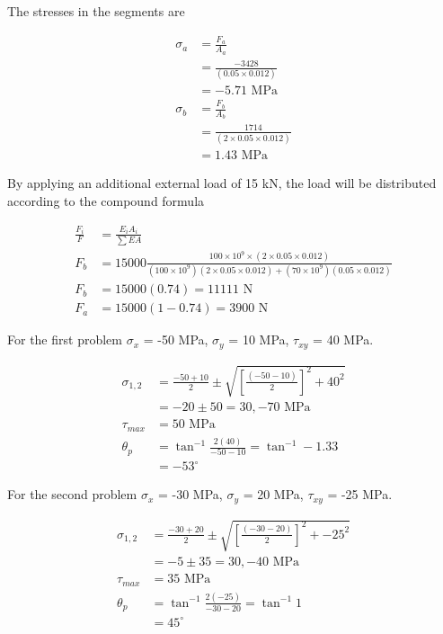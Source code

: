 \documentclass[
10pt,
a4paper,
openany,
svgnames,
]{book}
\begin{document}
\begin{evensolution}
  The stresses in the segments are

  \begin{align*}
    \sigma_a &= \frac{F_a}{A_a} \\
             &= \frac{-3428}{(0.05 \times 0.012)} \\
             &= -5.71 \text{ MPa} \\
    \sigma_b &= \frac{F_b}{A_b} \\
             &= \frac{1714}{(2 \times 0.05 \times 0.012)} \\
             &= 1.43 \text{ MPa}
  \end{align*}

  By applying an additional external load of 15 kN, the load will be distributed according to the compound formula

  \begin{align*}
    \frac{F_i}{F} &= \frac{E_iA_i}{\sum EA} \\
    F_b &= 15000 \frac{100 \times 10^9 \times (2 \times 0.05 \times 0.012)}{(100 \times 10^9)(2 \times 0.05 \times 0.012) + (70 \times 10^9)(0.05 \times 0.012)} \\
    F_b &= 15000(0.74) = 11111 \text{ N} \\
    F_a &= 15000(1 - 0.74) = 3900 \text{ N}
  \end{align*}

\item For the first problem $\sigma_x$ = -50 MPa, $\sigma_y$ = 10 MPa, $\tau_{xy}$ = 40 MPa.
  
  \begin{align*}
    \sigma_{1,2} &= \frac{-50 + 10}{2} \pm \sqrt{ \left[ \frac{(-50 - 10)}{2}\right]^2 + 40^2} \\
                 &= -20 \pm 50 = 30, -70 \text{ MPa} \\
    \tau_{max} &= 50 \text{ MPa} \\
    \theta_p &= \tan^{-1} \frac{2(40)}{-50-10} = \tan^{-1} -1.33 \\
                 &= -53^{\circ}
  \end{align*}

  For the second problem $\sigma_x$ = -30 MPa, $\sigma_y$ = 20 MPa, $\tau_{xy}$ = -25 MPa.

  \begin{align*}
    \sigma_{1,2} &= \frac{-30 + 20}{2} \pm \sqrt{ \left[ \frac{(-30 - 20)}{2}\right]^2 + -25^2} \\
                 &= -5 \pm 35 = 30, -40 \text{ MPa} \\
    \tau_{max} &= 35 \text{ MPa} \\
    \theta_p &= \tan^{-1} \frac{2(-25)}{-30-20} = \tan^{-1} 1 \\
                 &= 45^{\circ}
  \end{align*}


\end{evensolution}
\end{document}
